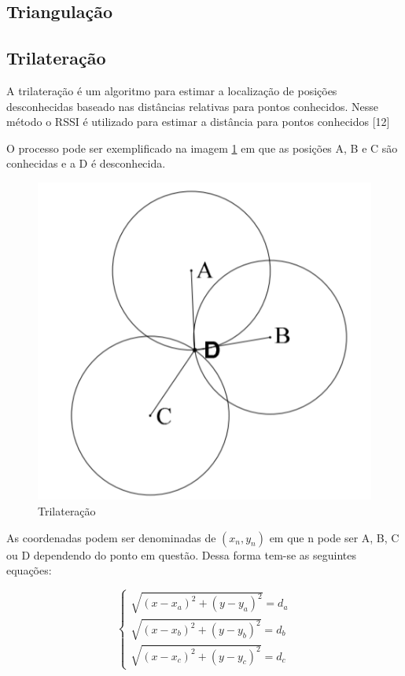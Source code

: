 \subsection{Triangulação}

\subsection{Trilateração}
A trilateração é um algoritmo para estimar a localização de posições desconhecidas baseado nas distâncias relativas para pontos conhecidos.
Nesse método o RSSI é utilizado para estimar a distância para pontos conhecidos [12]

O processo pode ser exemplificado na imagem \ref{fig:trilateration.png}  em que as posições A, B e C são conhecidas e a D é desconhecida. 
\begin{figure}[H]
	\centering 
	\includegraphics[scale = 1]{images/trilateration.png}
	\caption{Trilateração \cite{art1}}
	\label{fig:trilateration.png}
\end{figure}


As coordenadas podem ser denominadas de \( (x_n, y_n) \) em que n pode ser A, B, C ou D dependendo do ponto em questão. Dessa forma tem-se as seguintes equações:

\begin{equation*}
\begin{cases} \sqrt{(x - x_a)^2 + (y - y_a)^2} = d_a \\ \sqrt{(x - x_b)^2 + (y - y_b)^2} = d_b \\ \sqrt{(x - x_c)^2 + (y - y_c)^2} = d_c \end{cases}
\end{equation*}

